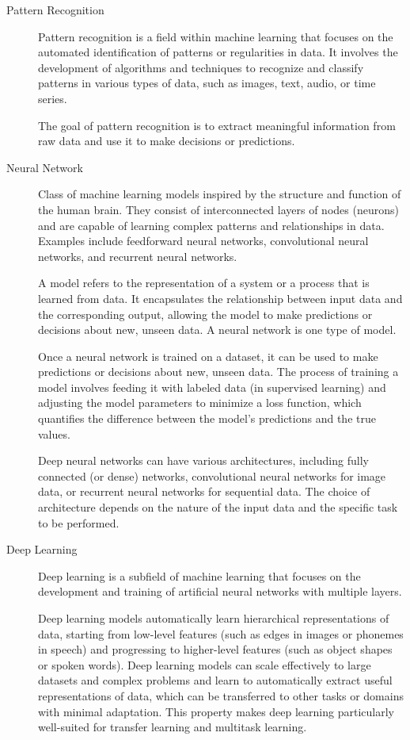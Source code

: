 \documentclass[a4paper]{report}
\begin{document}
\begin{description}
\item[Pattern Recognition]
Pattern recognition is a field within machine learning that focuses on the automated identification of patterns or regularities in data. It involves the development of algorithms and techniques to recognize and classify patterns in various types of data, such as images, text, audio, or time series.

The goal of pattern recognition is to extract meaningful information from raw data and use it to make decisions or predictions.

\item[Neural Network]
Class of machine learning models inspired by the structure and function of the human brain. They consist of interconnected layers of nodes (neurons) and are capable of learning complex patterns and relationships in data. Examples include feedforward neural networks, convolutional neural networks, and recurrent neural networks.

A model refers to the representation of a system or a process that is learned from data. It encapsulates the relationship between input data and the corresponding output, allowing the model to make predictions or decisions about new, unseen data. A neural network is one type of model.

Once a neural network is trained on a dataset, it can be used to make predictions or decisions about new, unseen data. The process of training a model involves feeding it with labeled data (in supervised learning) and adjusting the model parameters to minimize a loss function, which quantifies the difference between the model's predictions and the true values. 

Deep neural networks can have various architectures, including fully connected (or dense) networks, convolutional neural networks for image data, or recurrent neural networks for sequential data. The choice of architecture depends on the nature of the input data and the specific task to be performed.

\item[Deep Learning] 
Deep learning is a subfield of machine learning that focuses on the development and training of artificial neural networks with multiple layers. 

Deep learning models automatically learn hierarchical representations of data, starting from low-level features (such as edges in images or phonemes in speech) and progressing to higher-level features (such as object shapes or spoken words). Deep learning models can scale effectively to large datasets and complex problems and learn to automatically extract useful representations of data, which can be transferred to other tasks or domains with minimal adaptation. This property makes deep learning particularly well-suited for transfer learning and multitask learning.


\end{description}
\end{document}
